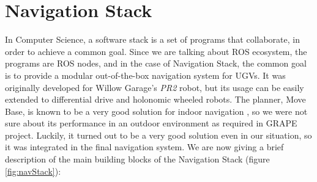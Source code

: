 


\section{Navigation Stack}\label{sec:navigationStack}

In Computer Science, a software stack is a set of programs that collaborate, in order to achieve a common goal. Since we are talking about \ac{ROS} ecosystem, the programs are \ac{ROS} nodes, and in the case of Navigation Stack, the common goal is to provide a modular out-of-the-box navigation system for \ac{UGV}s. It was originally developed for Willow Garage's \textit{PR2} robot, but its usage can be easily extended to differential drive and holonomic wheeled robots. The planner, Move Base, is known to be a very good solution for indoor navigation \parencite{moveBaseIndoor}, so we were not sure about its performance in an outdoor environment as required in \ac{GRAPE} project. Luckily, it turned out to be a very good solution even in our situation, so it was integrated in the final navigation system. We are now giving a brief description of the main building blocks of the Navigation Stack (figure \ref{fig:navStack}):

